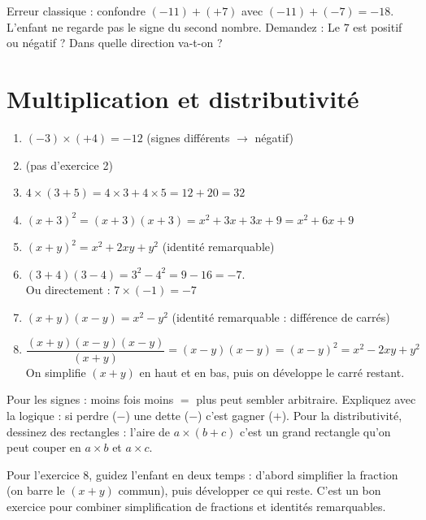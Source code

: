 \documentclass[11pt,a4paper]{article}
\newcommand{\corrbox}[1]{
\begin{tcolorbox}[colback=correctgreen!8!white,colframe=correctgreen!60!black]
#1
\end{tcolorbox}
}
\newcommand{\tipbox}[1]{
\begin{tcolorbox}[colback=tipblue!8!white,colframe=tipblue!60!black,title=\textbf{Comment expliquer}]
#1
\end{tcolorbox}
}
\newcommand{\warnbox}[1]{
\begin{tcolorbox}[colback=warnred!8!white,colframe=warnred!60!black,title=\textbf{Erreurs fr\'equentes}]
#1
\end{tcolorbox}
}
\begin{document}
\warnbox{
Erreur classique : confondre $(-11) + (+7)$ avec $(-11) + (-7) = -18$. L'enfant ne regarde pas le signe du second nombre. Demandez : \guillemotleft{} Le $7$ est positif ou n\'egatif ? Dans quelle direction va-t-on ? \guillemotright{}
}

\section{Multiplication et distributivit\'e}

\corrbox{
\begin{enumerate}
\item $(-3) \times (+4) = -12$ \quad (signes diff\'erents $\rightarrow$ n\'egatif)
\item (pas d'exercice 2)
\item $4 \times (3 + 5) = 4 \times 3 + 4 \times 5 = 12 + 20 = 32$
\item $(x + 3)^{2} = (x+3)(x+3) = x^{2} + 3x + 3x + 9 = x^{2} + 6x + 9$
\item $(x + y)^{2} = x^{2} + 2xy + y^{2}$ \quad (identit\'e remarquable)
\item $(3 + 4)(3 - 4) = 3^{2} - 4^{2} = 9 - 16 = -7$. \\ Ou directement : $7 \times (-1) = -7$
\item $(x + y)(x - y) = x^{2} - y^{2}$ \quad (identit\'e remarquable : diff\'erence de carr\'es)
\item $\dfrac{(x + y)(x - y)(x - y)}{(x + y)} = (x-y)(x-y) = (x-y)^{2} = x^{2} - 2xy + y^{2}$\\[0.2cm]
On simplifie $(x+y)$ en haut et en bas, puis on d\'eveloppe le carr\'e restant.
\end{enumerate}
}

\tipbox{
Pour les signes : \guillemotleft{} moins fois moins $=$ plus \guillemotright{} peut sembler arbitraire. Expliquez avec la logique : si perdre ($-$) une dette ($-$) c'est gagner ($+$). Pour la distributivit\'e, dessinez des rectangles : l'aire de $a \times (b + c)$ c'est un grand rectangle qu'on peut couper en $a \times b$ et $a \times c$.

\vspace{0.2cm}
Pour l'exercice 8, guidez l'enfant en deux temps : d'abord simplifier la fraction (on \guillemotleft{} barre \guillemotright{} le $(x+y)$ commun), puis d\'evelopper ce qui reste. C'est un bon exercice pour combiner simplification de fractions et identit\'es remarquables.
}
\end{document}
